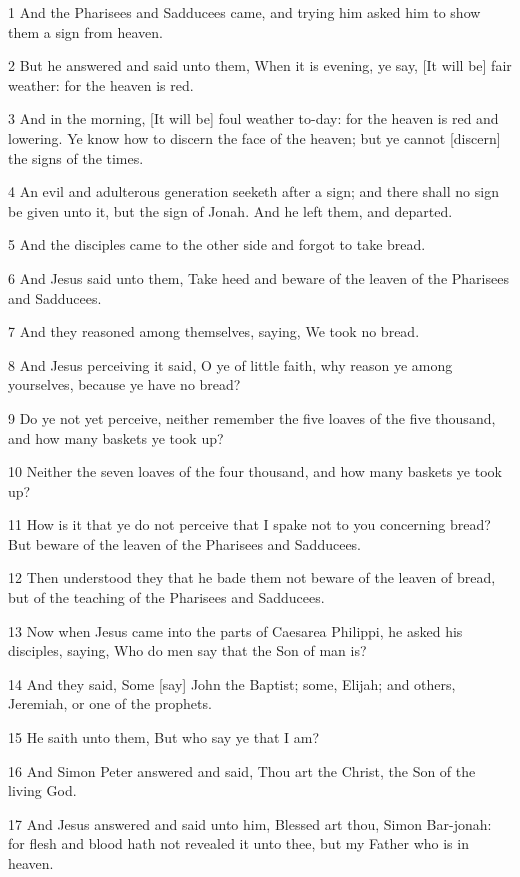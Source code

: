 \par 1 And the Pharisees and Sadducees came, and trying him asked him to show them a sign from heaven.
\par 2 But he answered and said unto them, When it is evening, ye say, [It will be] fair weather: for the heaven is red.
\par 3 And in the morning, [It will be] foul weather to-day: for the heaven is red and lowering. Ye know how to discern the face of the heaven; but ye cannot [discern] the signs of the times.
\par 4 An evil and adulterous generation seeketh after a sign; and there shall no sign be given unto it, but the sign of Jonah. And he left them, and departed.
\par 5 And the disciples came to the other side and forgot to take bread.
\par 6 And Jesus said unto them, Take heed and beware of the leaven of the Pharisees and Sadducees.
\par 7 And they reasoned among themselves, saying, We took no bread.
\par 8 And Jesus perceiving it said, O ye of little faith, why reason ye among yourselves, because ye have no bread?
\par 9 Do ye not yet perceive, neither remember the five loaves of the five thousand, and how many baskets ye took up?
\par 10 Neither the seven loaves of the four thousand, and how many baskets ye took up?
\par 11 How is it that ye do not perceive that I spake not to you concerning bread? But beware of the leaven of the Pharisees and Sadducees.
\par 12 Then understood they that he bade them not beware of the leaven of bread, but of the teaching of the Pharisees and Sadducees.
\par 13 Now when Jesus came into the parts of Caesarea Philippi, he asked his disciples, saying, Who do men say that the Son of man is?
\par 14 And they said, Some [say] John the Baptist; some, Elijah; and others, Jeremiah, or one of the prophets.
\par 15 He saith unto them, But who say ye that I am?
\par 16 And Simon Peter answered and said, Thou art the Christ, the Son of the living God.
\par 17 And Jesus answered and said unto him, Blessed art thou, Simon Bar-jonah: for flesh and blood hath not revealed it unto thee, but my Father who is in heaven.
